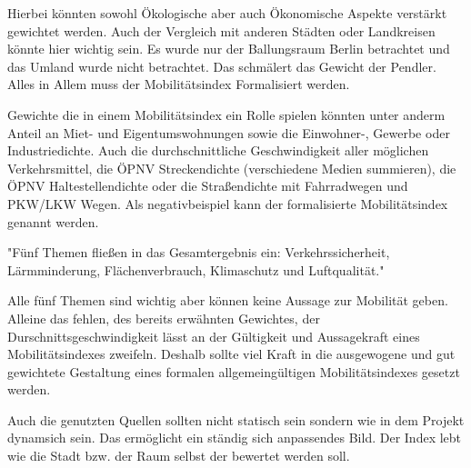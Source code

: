 Hierbei könnten sowohl Ökologische aber auch Ökonomische Aspekte verstärkt gewichtet werden. %
Auch der Vergleich mit anderen Städten oder Landkreisen könnte hier wichtig sein. Es wurde nur der Ballungsraum Berlin betrachtet und das Umland wurde nicht betrachtet. Das schmälert das Gewicht der Pendler. Alles in Allem muss der Mobilitätsindex Formalisiert werden. 

Gewichte die in einem Mobilitätsindex ein Rolle spielen könnten unter anderm Anteil an Miet- und Eigentumswohnungen sowie die Einwohner-, 
Gewerbe oder Industriedichte. Auch die durchschnittliche Geschwindigkeit aller möglichen Verkehrsmittel, 
die ÖPNV Streckendichte (verschiedene Medien summieren), die ÖPNV Haltestellendichte oder die Straßendichte mit Fahrradwegen und PKW/LKW Wegen.
Als negativbeispiel kann der formalisierte Mobilitätsindex genannt werden.





"Fünf Themen fließen in das Gesamtergebnis ein: Verkehrssicherheit, Lärmminderung, Flächenverbrauch, Klimaschutz und Luftqualität."


Alle fünf Themen sind wichtig aber können keine Aussage zur Mobilität geben. Alleine das fehlen, des bereits erwähnten Gewichtes, der Durschnittsgeschwindigkeit lässt an der Gültigkeit und Aussagekraft eines Mobilitätsindexes zweifeln.
Deshalb sollte viel Kraft in die ausgewogene und gut gewichtete Gestaltung eines formalen allgemeingültigen Mobilitätsindexes gesetzt werden.

Auch die genutzten Quellen sollten nicht statisch sein sondern wie in dem Projekt dynamsich sein. Das ermöglicht ein ständig sich anpassendes Bild. Der Index lebt wie die Stadt bzw. der Raum selbst der bewertet werden soll.
